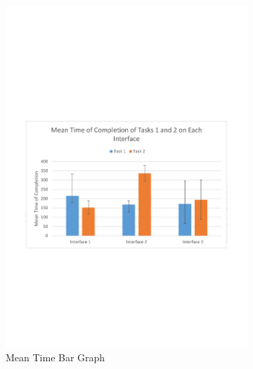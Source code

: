 \documentclass{l4proj}
\begin{document}
\begin{figure}[H]
	\begin{subfigure}{.5\textwidth}
		\centering
		\includegraphics[width=\textwidth]{charts/table1.pdf}
		\caption{Mean Time Bar Graph}
		\label{ch:meantimebargraph}
	\end{subfigure}
	\begin{subfigure}{.5\textwidth}
		\centering

\end{subfigure}
\end{figure}
\end{document}
